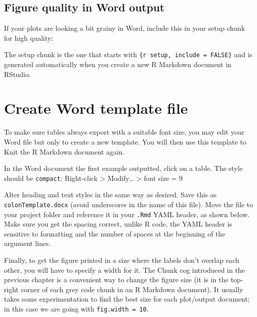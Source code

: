 \documentclass[
  12pt,
  krantz2]{krantz}
\makeatletter
\newenvironment{Shaded}{\begin{snugshade}}{\end{snugshade}}
\newcommand{\DataTypeTok}[1]{\textcolor[rgb]{0.13,0.29,0.53}{#1}}
\newcommand{\DecValTok}[1]{\textcolor[rgb]{0.00,0.00,0.81}{#1}}
\newcommand{\KeywordTok}[1]{\textcolor[rgb]{0.13,0.29,0.53}{\textbf{#1}}}
\newcommand{\NormalTok}[1]{#1}
\newcommand{\OperatorTok}[1]{\textcolor[rgb]{0.81,0.36,0.00}{\textbf{#1}}}
\newenvironment{kframe}{%
\medskip{}
\setlength{\fboxsep}{.8em}
 \def\at@end@of@kframe{}%
 \ifinner\ifhmode%
  \def\at@end@of@kframe{\end{minipage}}%
  \begin{minipage}{\columnwidth}%
 \fi\fi%
 \def\FrameCommand##1{\hskip\@totalleftmargin \hskip-\fboxsep
 \colorbox{shadecolor}{##1}\hskip-\fboxsep
     \hskip-\linewidth \hskip-\@totalleftmargin \hskip\columnwidth}%
 \MakeFramed {\advance\hsize-\width
   \@totalleftmargin\z@ \linewidth\hsize
   \@setminipage}}%
 {\par\unskip\endMakeFramed%
 \at@end@of@kframe}
\renewenvironment{Shaded}{\begin{kframe}}{\end{kframe}}
\makeatother
\begin{document}
\hypertarget{figure-quality-in-word-output}{%
\subsection{Figure quality in Word output}\label{figure-quality-in-word-output}}

If your plots are looking a bit grainy in Word, include this in your setup chunk for high quality:

\begin{Shaded}
\end{Shaded}

The setup chunk is the one that starts with \texttt{\textasciigrave{}\textasciigrave{}\textasciigrave{}\{r\ setup,\ include\ =\ FALSE\}} and is generated automatically when you create a new R Markdown document in RStudio.

\hypertarget{create-word-template-file}{%
\section{Create Word template file}\label{create-word-template-file}}

To make sure tables always export with a suitable font size, you may edit your Word file but only to create a new template.
You will then use this template to Knit the R Markdown document again.

In the Word document the first example outputted, click on a table.
The style should be \texttt{compact}:
Right-click \textgreater{} Modify\ldots{} \textgreater{} font size = 9

Alter heading and text styles in the same way as desired.
Save this as \texttt{colonTemplate.docx} (avoid underscores in the name of this file).
Move the file to your project folder and reference it in your \texttt{.Rmd} YAML header, as shown below.
Make sure you get the spacing correct, unlike R code, the YAML header is sensitive to formatting and the number of spaces at the beginning of the argument lines.

Finally, to get the figure printed in a size where the labels don't overlap each other, you will have to specify a width for it.
The Chunk cog introduced in the previous chapter is a convenient way to change the figure size (it is in the top-right corner of each grey code chunk in an R Markdown document).
It usually takes some experimentation to find the best size for each plot/output document; in this case we are going with \texttt{fig.width\ =\ 10}.
\end{document}

